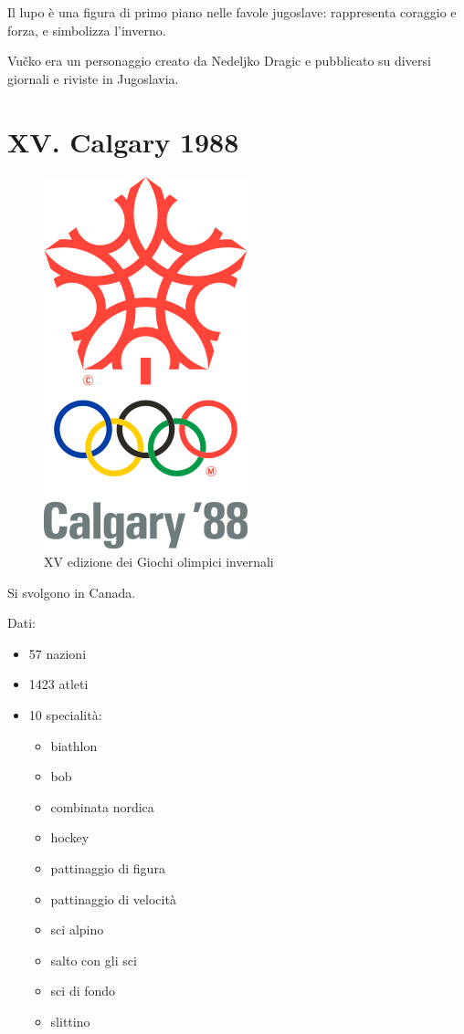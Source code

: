 \documentclass[
]{book}
\providecommand{\tightlist}{%
  \setlength{\itemsep}{0pt}\setlength{\parskip}{0pt}}
\begin{document}
Il lupo è una figura di primo piano nelle favole jugoslave: rappresenta coraggio e forza, e simbolizza l'inverno.

Vučko era un personaggio creato da Nedeljko Dragic e pubblicato su diversi giornali e riviste in Jugoslavia.

\chapter*{XV. Calgary 1988}\label{xv.-calgary-1988}

\begin{figure}
\includegraphics[width=0.4\linewidth]{images/loghi/1988} \caption{XV edizione dei Giochi olimpici invernali}\label{fig:unnamed-chunk-47}
\end{figure}

Si svolgono in Canada.

Dati:

\begin{itemize}
\tightlist
\item
  57 nazioni
\item
  1423 atleti
\item
  10 specialità:

  \begin{itemize}
  \tightlist
  \item
    biathlon
  \item
    bob
  \item
    combinata nordica
  \item
    hockey
  \item
    pattinaggio di figura
  \item
    pattinaggio di velocità
  \item
    sci alpino
  \item
    salto con gli sci
  \item
    sci di fondo
  \item
    slittino
  \end{itemize}
\end{itemize}
\end{document}
